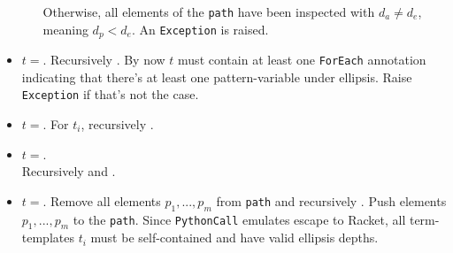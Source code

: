 \begin{itemize}
\begin{itemize}
	  Otherwise, all elements of the \texttt{path} have been inspected with $d_a \neq d_e$, meaning $d_p < d_e$. An \texttt{Exception} is raised.
	\end{itemize}
\item
$t=$\TermRepeat. Recursively . By now $t$ must contain at least one \texttt{ForEach} annotation indicating that there's at least one pattern-variable under ellipsis. Raise \texttt{Exception} if that's not the case.
\item
$t=$\TermSequence. For $t_i$, recursively .
\item
$t=$\TermInHole. \\ Recursively  and .
\item
$t=$\PythonCall. Remove all elements $p_1, ..., p_m$ from \texttt{path} and recursively . Push elements $p_1, ..., p_m$ to the \texttt{path}. Since \texttt{PythonCall} emulates escape to Racket, all term-templates $t_i$ must be self-contained and have valid ellipsis depths.
\end{itemize}
